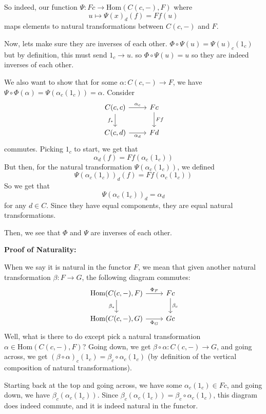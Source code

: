 \documentclass{article}
\begin{document}
\begin{customproof}
So indeed, our function $\Psi: Fc \to \text{Hom}(C(c, -), F)$ where $$u \mapsto \Psi(x)_d(f) = Ff(u)$$maps elements to natural transformations between $C(c,-)$ and $F$. 

Now, lets make sure they are inverses of each other. $\Phi \circ \Psi(u) = \Psi(u)_c(1_c)$ but by definition, this must send $1_c \to u$. so $\Phi \circ \Psi(u) = u$ so they are indeed inverses of each other. 

We also want to show that for some $\alpha: C(c, -) \to F$, we have $\Psi \circ \Phi(\alpha) = \Psi(\alpha_c(1_c)) = \alpha$. Consider \[\begin{tikzcd}
	C(c,c) & Fc\\
	C(c,d) & Fd
	\arrow[from=1-1, to=1-2, "\alpha_c"]
	\arrow[from=1-1, to=2-1, "f_*"']
	\arrow[from=1-2, to=2-2, "Ff"]
	\arrow[from=2-1, to=2-2, "\alpha_d"']
\end{tikzcd}\]commutes. Picking $1_c$ to start, we get that $$\alpha_d(f) = Ff(\alpha_c(1_c))$$But then, for the natural transformation $\Psi(\alpha_c(1_c))$, we defined $$\Psi(\alpha_c(1_c))_d(f) = Ff(\alpha_c(1_c))$$So we get that $$\Psi(\alpha_c(1_c))_d = \alpha_d$$for any $d \in C$. Since they have equal components, they are equal natural transformations.

Then, we see that $\Phi$ and $\Psi$ are inverses of each other.

\textbf{Proof of Naturality:}

When we say it is natural in the functor $F$, we mean that given another natural transformation $\beta: F \to G$, the following diagram commutes: \[\begin{tikzcd}
	\text{Hom}(C(c,-), F) & Fc\\
	\text{Hom}(C(c,-), G) & Gc
	\arrow[from=1-1, to=2-1, "\beta_*"']
	\arrow[from=1-1, to=1-2, "\Phi_F"]
	\arrow[from=2-1, to=2-2, "\Phi_G"']
	\arrow[from=1-2, to=2-2, "\beta_c"]
\end{tikzcd}\]Well, what is there to do except pick a natural transformation $\alpha \in \text{Hom}(C(c,-), F)$? Going down, we get $\beta \circ \alpha: C(c,-) \to G$, and going across, we get $(\beta \circ \alpha)_c(1_c) = \beta_c \circ \alpha_c(1_c)$ (by definition of the vertical composition of natural transformations).

Starting back at the top and going across, we have some $\alpha_c(1_c) \in Fc$, and going down, we have $\beta_c(\alpha_c(1_c))$. Since $\beta_c(\alpha_c(1_c)) = \beta_c \circ \alpha_c(1_c)$, this diagram does indeed commute, and it is indeed natural in the functor. 


\end{customproof}
\end{document}
